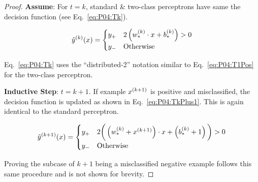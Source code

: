 \begin{proof}
\noindent
\textbf{Assume}: For $t=k$, standard \& two-class perceptrons have same the decision function (see Eq.~\eqref{eq:P04:Tk}).

\begin{equation}\label{eq:P04:Tk}
  \hat{y}^{(k)}(x) = \begin{cases}
                       y_{+} & 2\left(w^{(k)}_{*} \cdot x + b^{(k)}_{*}\right) > 0 \\
                       y_{-} & \text{Otherwise}
                     \end{cases}
\end{equation}

\noindent
Eq.~\eqref{eq:P04:Tk} uses the ``distributed-2'' notation similar to Eq.~\eqref{eq:P04:T1Pos} for the two-class perceptron.

\noindent
\textbf{Inductive Step}: $t=k+1$. If example $x^{(k+1)}$ is positive and misclassified, the decision function is updated as shown in Eq.~\eqref{eq:P04:TkPlus1}. This is again identical to the standard perceptron.

\begin{equation}\label{eq:P04:TkPlus1}
  \hat{y}^{(k+1)}(x) = \begin{cases}
    y_{+} & 2\bigg(\left(w^{(k)}_{*} + x^{(k+1)}\right)\cdot x + \left(b^{(k)}_{*}+1\right)\bigg) > 0 \\
                         y_{-} & \text{Otherwise}
                       \end{cases}
\end{equation}

\noindent
Proving the subcase of $k+1$ being a misclassified negative example follows this same procedure and is not shown for brevity.
\end{proof}
